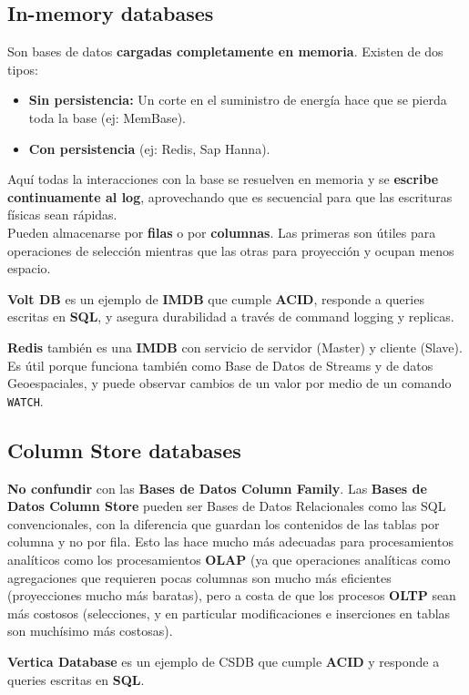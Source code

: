 \subsection*{In-memory databases}
Son bases de datos \textbf{cargadas completamente en memoria}. Existen de dos tipos:
\begin{itemize}
    \item \textbf{Sin persistencia:} Un corte en el suministro de energía hace que se pierda toda la base (ej: MemBase).
    \item \textbf{Con persistencia} (ej: Redis, Sap Hanna).
\end{itemize}
Aquí todas la interacciones con la base se resuelven en memoria y se \textbf{escribe continuamente al log}, aprovechando que es secuencial para que las escrituras físicas sean rápidas. \\
Pueden almacenarse por \textbf{filas} o por \textbf{columnas}. Las primeras son útiles para operaciones de selección mientras que las otras para proyección y ocupan menos espacio.

\textbf{Volt DB} es un ejemplo de \textbf{IMDB} que cumple \textbf{ACID}, responde a queries escritas en \textbf{SQL}, y asegura durabilidad a través de command logging y replicas.

\textbf{Redis} también es una \textbf{IMDB} con servicio de servidor (Master) y cliente (Slave). Es útil porque funciona también como Base de Datos de Streams y de datos Geoespaciales, y puede observar cambios de un valor por medio de un comando \texttt{WATCH}.

\subsection*{Column Store databases}
\textbf{No confundir} con las \textbf{Bases de Datos Column Family}. Las \textbf{Bases de Datos Column Store} pueden ser Bases de Datos Relacionales como las SQL convencionales, con la diferencia que guardan los contenidos de las tablas por columna y no por fila. Esto las hace mucho más adecuadas para procesamientos analíticos como los procesamientos \textbf{OLAP} (ya que operaciones analíticas como agregaciones que requieren pocas columnas son mucho más eficientes (proyecciones mucho más baratas), pero a costa de que los procesos \textbf{OLTP} sean más costosos (selecciones, y en particular modificaciones e inserciones en tablas son muchísimo más costosas).

\textbf{Vertica Database} es un ejemplo de CSDB que cumple \textbf{ACID} y responde a queries escritas en \textbf{SQL}.

